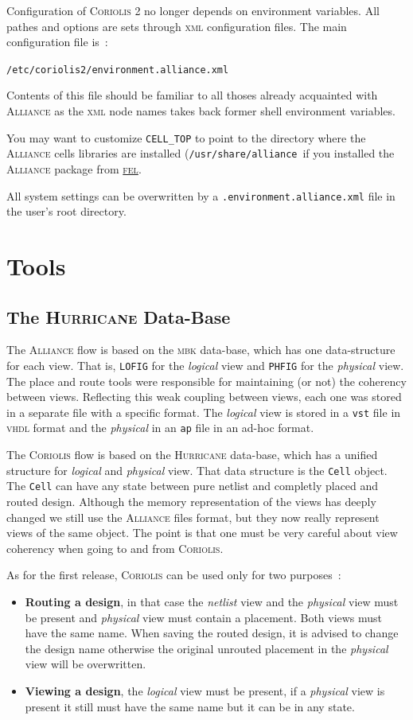 \documentclass[11pt]{article}
\newcommand{\xhref}        [2]{\href{#2}{#1}}
\newcommand{\xhref}        [2]{\htmladdnormallink{#1}{#2}}
\newcommand {\XML}                {\textsc{xml}\xspace}
\newcommand {\VHDL}               {\textsc{vhdl}\xspace}
\newcommand {\FEL}                {\xhref{\textsc{fel}}{http://spins.fedoraproject.org/fel/}\xspace}
\newcommand {\netlist}            {\textit{netlist}\xspace}
\newcommand {\physical}           {\textit{physical}\xspace}
\newcommand {\logical}            {\textit{logical}\xspace}
\newcommand {\Alliance}           {\textsc{Alliance}\xspace}
\newcommand {\MBK}                {\textsc{mbk}\xspace}
\newcommand {\vst}                {\texttt{vst}\xspace}
\newcommand {\ap}                 {\texttt{ap}\xspace}
\newcommand {\PHFIG}              {\texttt{PHFIG}\xspace}
\newcommand {\LOFIG}              {\texttt{LOFIG}\xspace}
\newcommand {\Coriolis}           {\textsc{Coriolis}\xspace}
\newcommand {\CoriolisII}         {\textsc{Coriolis 2}\xspace}
\newcommand {\Hurricane}          {\textsc{Hurricane}\xspace}
\newcommand {\CELLTOP}            {\texttt{CELL\_TOP}\xspace}
\newcommand {\confcoriolisIIalc}  {\texttt{/etc/coriolis2/environment.alliance.xml}\xspace}
\newcommand {\usercoriolisIIalc}  {\texttt{.environment.alliance.xml}\xspace}
\newcommand {\Cell}               {\texttt{Cell}\xspace}
\begin{document}
 Configuration of \CoriolisII no longer depends on environment variables.
 All pathes and options are sets through \XML configuration files. The main
 configuration file is~:
 \begin{center}
   \confcoriolisIIalc
 \end{center}
  Contents of this file should be familiar to all thoses already acquainted
  with \Alliance as the \XML node names takes back former shell environment
  variables.

  You may want to customize \CELLTOP to point to the directory where the \Alliance cells
  libraries are installed (\texttt{/usr/share/alliance}\ if you installed
  the \Alliance package from \FEL.

  All system settings can be overwritten by a \usercoriolisIIalc file in the
  user's root directory.


  \section{Tools}

  \subsection{The \Hurricane Data-Base}

  The \Alliance flow is based on the \MBK data-base, which has one data-structure
  for each view. That is, \LOFIG for the \logical view and \PHFIG for the \physical
  view. The place and route tools were responsible for maintaining (or not) the
  coherency between views. Reflecting this weak coupling between views, each one
  was stored in a separate file with a specific format. The \logical view is stored
  in a \vst file in \VHDL format and the \physical in an \ap file in an ad-hoc format.

  The \Coriolis flow is based on the \Hurricane data-base, which has a unified
  structure for \logical and \physical view. That data structure is the \Cell object.
  The \Cell can have any state between pure netlist and completly placed and
  routed design. Although the memory representation of the views has deeply
  changed we still use the \Alliance files format, but they now really represent
  views of the same object. The point is that one must be very careful about
  view coherency when going to and from \Coriolis.

  As for the first release, \Coriolis can be used only for two purposes~:
  \begin{itemize}
    \item \textbf{Routing a design}\xspace, in that case the \netlist\xspace
          view and the \physical view must be present and  \physical view must contain
          a placement. Both views must have the same name. When saving the routed design,
          it is advised to change the design name otherwise the original unrouted placement
          in the \physical view will be overwritten.
    \item \textbf{Viewing a design}, the \logical view must be present, if a \physical
          view is present it still must have the same name but it can be in any
          state. 
  \end{itemize}
\end{document}
